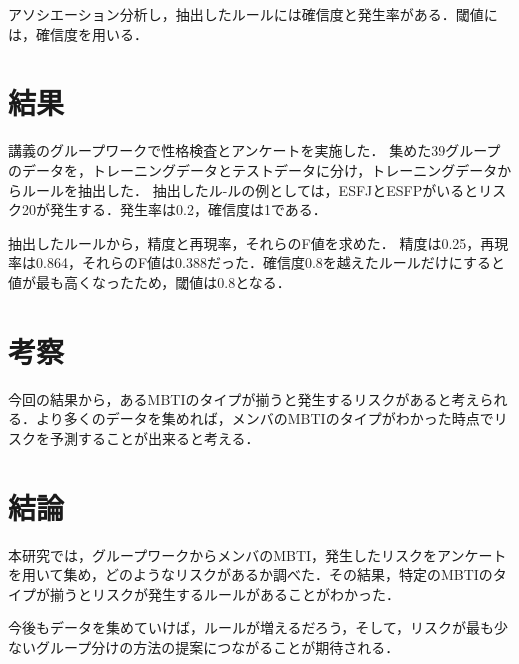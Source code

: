 \documentclass[uplatex,twocolumn,dvipdfmx]{jsarticle}
\begin{document}
アソシエーション分析し，抽出したルールには確信度と発生率がある．閾値には，確信度を用いる．
\section{結果}
講義のグループワークで性格検査とアンケートを実施した．
集めた39グループのデータを，トレーニングデータとテストデータに分け，トレーニングデータからルールを抽出した．
抽出したル-ルの例としては，ESFJとESFPがいるとリスク20が発生する．発生率は0.2，確信度は1である．

抽出したルールから，精度と再現率，それらのF値を求めた．
精度は0.25，再現率は0.864，それらのF値は0.388だった．確信度0.8を越えたルールだけにすると値が最も高くなったため，閾値は0.8となる．
\section{考察}
今回の結果から，あるMBTIのタイプが揃うと発生するリスクがあると考えられる．より多くのデータを集めれば，メンバのMBTIのタイプがわかった時点でリスクを予測することが出来ると考える．

\section{結論}
本研究では，グループワークからメンバのMBTI，発生したリスクをアンケートを用いて集め，どのようなリスクがあるか調べた．その結果，特定のMBTIのタイプが揃うとリスクが発生するルールがあることがわかった．

今後もデータを集めていけば，ルールが増えるだろう，そして，リスクが最も少ないグループ分けの方法の提案につながることが期待される．
\nocite{MBTI}

\end{document}
